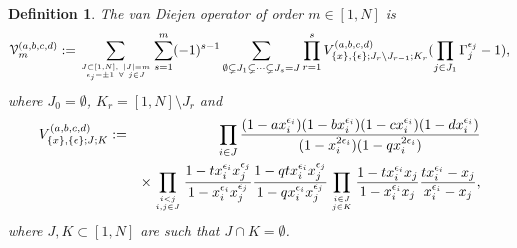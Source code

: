 \documentclass[12pt]{amsart}
\newtheorem{defn}[thm]{Definition}
\numberwithin{equation}{section}
\begin{document}
\begin{defn}\label{defVandiej}
The van Diejen operator of order $m\in[1,N]$ is
 \begin{equation}\label{vandiealpha}
 {\mathcal V}_m^{(a,b,c,d)}:=\sum_{J\subset [1,N],\ |J|=m\atop \epsilon_j=\pm 1 \ \forall \ j\in J}\sum_{s=1}^m (-1)^{s-1}
 \sum_{\emptyset\subsetneq J_1\subsetneq \cdots \subsetneq J_s=J}
 \prod_{r=1}^s V_{\{x\},\{\epsilon\};J_r \setminus J_{r-1};K_r}^{(a,b,c,d)} (\prod_{j\in J_1} \Gamma_j^{\epsilon_j}-1),
\end{equation}
where $J_0=\emptyset$, $K_r=[1,N]\setminus J_r$ and
\begin{eqnarray}V_{\{x\},\{\epsilon\};J;K}^{(a,b,c,d)}&:=&
\prod_{i\in J} \frac{(1-a x_i^{\epsilon_i})(1- b x_i^{\epsilon_i})(1-c x_i^{\epsilon_i})(1-d x_i^{\epsilon_i})}{(1- x_i^{2\epsilon_i})(1- qx_i^{2\epsilon_i})} \nonumber \\
&&\times 
\prod_{{i<j}\atop {i,j\in J}}\frac{1-t x_i^{\epsilon_i}x_j^{\epsilon_j}}{1-x_i^{\epsilon_i}x_j^{\epsilon_j}}\frac{1-qt x_i^{\epsilon_i}x_j^{\epsilon_j}}{1-qx_i^{\epsilon_i}x_j^{\epsilon_j}} 
\prod_{i\in J\atop j\in K}  \frac{1-t x_i^{\epsilon_i}x_j}{1-x_i^{\epsilon_i}x_j}
 \frac{t x_i^{\epsilon_i}-x_j}{x_i^{\epsilon_i}-x_j},\label{defV}
\end{eqnarray}
where $J,K\subset [1,N]$ are such that $J\cap K=\emptyset$.
\end{defn}
%
\end{document}
